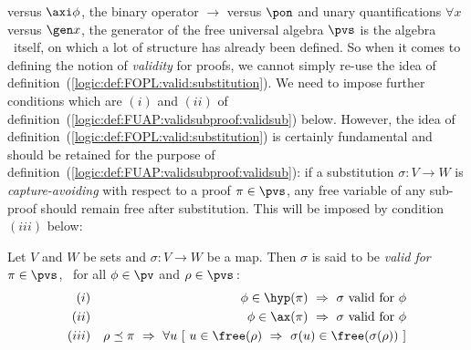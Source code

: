 versus $\axi\phi$, the binary operator $\to$ versus $\pon$ and unary
quantifications $\forall x$ versus $\gen x$, the generator of the
free universal algebra $\pvs$ is the algebra \pv\ itself, on which a
lot of structure has already been defined. So when it comes to
defining the notion of {\em validity} for proofs, we cannot simply
re-use the idea of
definition~(\ref{logic:def:FOPL:valid:substitution}). We need to
impose further conditions which are $(i)$ and $(ii)$ of
definition~(\ref{logic:def:FUAP:validsubproof:validsub}) below.
However, the idea of
definition~(\ref{logic:def:FOPL:valid:substitution}) is certainly
fundamental and should be retained for the purpose of
definition~(\ref{logic:def:FUAP:validsubproof:validsub}): if a
substitution $\sigma:V\to W$ is {\em capture-avoiding} with respect
to a proof $\pi\in\pvs$, any free variable of any sub-proof should
remain free after substitution. This will be imposed by condition
$(iii)$ below:

\begin{defin}\label{logic:def:FUAP:validsubproof:validsub}
Let $V$ and $W$ be sets and $\sigma:V\to W$ be a map. Then $\sigma$
is said to be {\em valid for} $\pi\in\pvs$, \ifand\ for all
$\phi\in\pv$ and $\rho\in\pvs$\,:
    \begin{eqnarray*}
    (i)&&\phi\in\hyp(\pi)\ \Rightarrow\ \mbox{$\sigma$ valid for $\phi$}\\
    (ii)&&\phi\in\ax(\pi)\ \Rightarrow\ \mbox{$\sigma$ valid for $\phi$}\\
    (iii)&&\rho\preceq\pi\ \Rightarrow\ \forall u\ [\ u\in\free(\rho)\
    \Rightarrow\ \sigma(u)\in\free(\sigma(\rho))\ ]
    \end{eqnarray*}
\end{defin}

